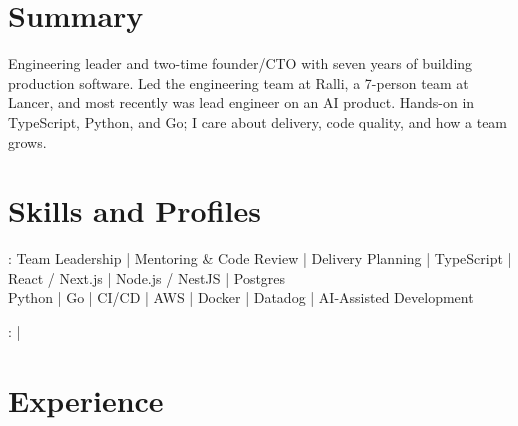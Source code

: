 \documentclass[print]{jack-resume}
\begin{document}
\pagecolor{darkmodeBackground}


\begin{minipage}[t][1cm][t]{.03\textwidth}
    \hfill
\end{minipage}

\section{Summary}
Engineering leader and two-time founder/CTO with seven years of building production software. Led the engineering team at Ralli, a 7-person team at Lancer, and most recently was lead engineer on an AI product. Hands-on in TypeScript, Python, and Go; I care about delivery, code quality, and how a team grows.
\sectionsep

\section{Skills and Profiles}
:
Team Leadership \hfill | \hfill
Mentoring \& Code Review \hfill | \hfill
Delivery Planning \hfill | \hfill
TypeScript \hfill | \hfill
React / Next.js \hfill | \hfill
Node.js / NestJS \hfill | \hfill
Postgres \\
\hspace{1.0cm} Python \hfill | \hfill
Go \hfill | \hfill
CI/CD \hfill | \hfill
AWS \hfill | \hfill
Docker \hfill | \hfill
Datadog \hfill | \hfill
AI-Assisted Development \\

\raggedright{
    :
      \href{https://www.linkedin.com/in/jack-sturtevant/}{ \ExternalLink} |
     \href{https://github.com/jacksturt}{ \ExternalLink}}

\section{Experience}
\end{document}
